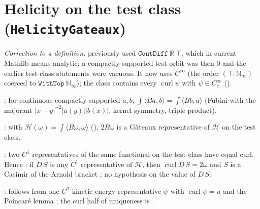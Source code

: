 \documentclass[11pt]{article}
\begin{document}
\section{Helicity on the test class (\texttt{HelicityGateaux})}\label{sec:hel}
\noindent\emph{Correction to a definition.}  previously used $\texttt{ContDiff}\ \mathbb{R}\ \top$, which in current Mathlib means analytic; a compactly supported test orbit was then $0$ and the earlier test-class statements were vacuous. It now uses $C^\infty$ (the order $(\top:\mathbb{N}_\infty)$ coerced to $\texttt{WithTop}\ \mathbb{N}_\infty$); the class contains every $\operatorname{curl}\psi$ with $\psi\in C^\infty_c$ (\coined).
\begin{theorem}\coined: for continuous compactly supported $a,b$, $\int\langle Ba,b\rangle=\int\langle Bb,a\rangle$ (Fubini with the majorant $|x-y|^{-2}|a(y)||b(x)|$, kernel symmetry, triple product).\end{theorem}
\begin{theorem}\coined: with $\mathcal H(\omega)=\int\langle B\omega,\omega\rangle$ (\coined), $2B\omega$ is a G\^ateaux representative of $\mathcal H$ on the test class.\end{theorem}
\begin{theorem}\coined: two $C^1$ representatives of the same functional on the test class have equal curl. Hence \coined: if $D\,S$ is any $C^1$ representative of $\mathcal H$, then $\operatorname{curl} D\,S=2\omega$ and $S$ is a Casimir of the Arnold bracket ; no hypothesis on the value of $D\,S$.\end{theorem}
\begin{theorem}\coined:  follows from one $C^2$ kinetic-energy representative $\psi$ with $\operatorname{curl}\psi=u$ and the Poincar\'e lemma \coined; the curl half of uniqueness is \coined.\end{theorem}
\end{document}
